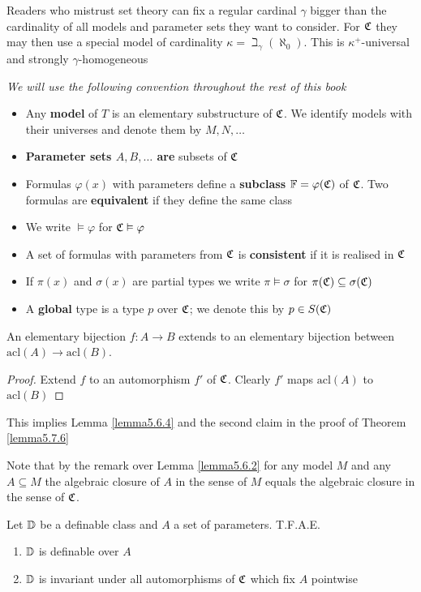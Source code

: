 \documentclass[11pt]{article}
\def \acl {\text{acl}}
\begin{document}
Readers who mistrust set theory can fix a regular cardinal \(\gamma\) bigger than the cardinality of all
models and parameter sets they want to consider. For \(\mathfrak{C}\) they may then use a special model of
cardinality \(\kappa=\beth_\gamma(\aleph_0)\). This is \(\kappa^+\)-universal and strongly \(\gamma\)-homogeneous

\emph{We will use the following convention throughout the rest of this book}
\begin{itemize}
\item Any \textbf{model} of \(T\) is an elementary substructure of \(\mathfrak{C}\). We identify models with their
universes and denote them by \(M,N,\dots\)
\item \textbf{Parameter sets \(A,B,\dots\) are} subsets of \(\mathfrak{C}\)
\item Formulas \(\varphi(x)\) with parameters define a \textbf{subclass} \(\mathbb{F}=\varphi(\mathfrak{C})\) of \(\mathfrak{C}\). Two formulas are
\textbf{equivalent} if they define the same class
\item We write \(\vDash\varphi\) for \(\mathfrak{C}\vDash\varphi\)
\item A set of formulas with parameters from \(\mathfrak{C}\) is \textbf{consistent} if it is realised in \(\mathfrak{C}\)
\item If \(\pi(x)\) and \(\sigma(x)\) are partial types we write \(\pi\vDash\sigma\) for \(\pi(\mathfrak{C})\subseteq\sigma(\mathfrak{C})\)
\item A \textbf{global} type is a type \(p\) over \(\mathfrak{C}\); we denote this by \(p\in S(\mathfrak{C})\)
\end{itemize}


\begin{lemma}[]
An elementary bijection \(f:A\to B\) extends to an elementary bijection between \(\acl(A)\to\acl(B)\).
\end{lemma}

\begin{proof}
Extend \(f\) to an automorphism \(f'\) of \(\mathfrak{C}\). Clearly \(f'\) maps \(\acl(A)\) to \(\acl(B)\)
\end{proof}

This implies Lemma \ref{lemma5.6.4} and the second claim in the proof of Theorem \ref{lemma5.7.6}


Note that by the remark over Lemma \ref{lemma5.6.2} for any model \(M\) and any \(A\subseteq M\) the
algebraic closure of \(A\) in the sense of \(M\) equals the algebraic closure in the sense
of \(\mathfrak{C}\).

\begin{lemma}[]
Let \(\mathbb{D}\) be a definable class and \(A\) a set of parameters. T.F.A.E.
\begin{enumerate}
\item \(\mathbb{D}\) is definable over \(A\)
\item \(\mathbb{D}\) is invariant under all automorphisms of \(\mathfrak{C}\) which fix \(A\) pointwise
\end{enumerate}
\end{lemma}
\end{document}
